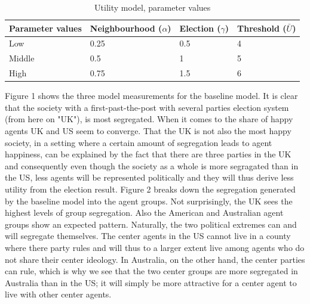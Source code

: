 \documentclass[12pt, a4paper]{article}
\begin{document}
	\begin{table}[ht]
		\centering
		\caption{Utility model, parameter values}
		\begin{tabular}{llll}
			\hline
			Parameter values & Neighbourhood ($\alpha$) & Election ($\gamma$) & Threshold ($\bar{U}$) \\ 
			\hline \hline
			Low & 0.25 & 0.5 & 4 \\ 
			Middle & 0.5 & 1 & 5 \\ 
			High & 0.75 & 1.5 & 6 \\ \hline
			\hline
		\end{tabular}
	\end{table}
	
	Figure 1 shows the three model measurements for the baseline model. It is clear that the society with a first-past-the-post with several parties election system (from here on "UK"), is most segregated. When it comes to the share of happy agents UK and US seem to converge. That the UK is not also the most happy society, in a setting where a certain amount of segregation leads to agent happiness, can be explained by the fact that there are three parties in the UK and consequently even though the society as a whole is more segragated than in the US, less agents will be represented politically and they will thus derive less utility from the election result. Figure 2 breaks down the segregation generated by the baseline model into the agent groups. Not surprisingly, the UK sees the highest levels of group segregation. Also the American and Australian agent groups show an expected pattern. Naturally, the two political extremes can and will segregate themselves. The center agents in the US cannot live in a county where there party rules and will thus to a larger extent live among agents who do not share their center ideology. In Australia, on the other hand, the center parties can rule, which is why we see that the two center groups are more segregated in Australia than in the US; it will simply be more attractive for a center agent to live with other center agents. \newline \newline
\end{document}
